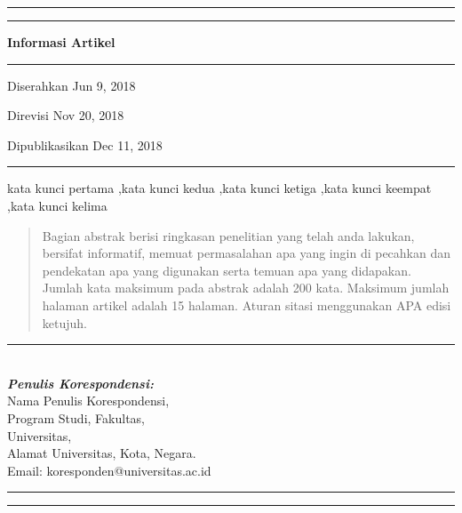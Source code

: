 \documentclass{iaesarticle-progres}
\begin{document}
\hrule
\vspace{.1em}
\hrule
\vspace{.5em}
\noindent
\parbox[t][][s]{0.275\textwidth}{%
\textbf{Informasi Artikel}
\vspace{.5em}
\hrule
\vspace{.5em}
\begin{history}
\vspace{.5em}

Diserahkan Jun 9, 2018

Direvisi Nov 20, 2018

Dipublikasikan Dec 11, 2018

\vspace{.7em}
\end{history}
\vspace{.5em}
\hrule
\vspace{.5em}
\begin{keyword} 
\vspace{.5em}
kata kunci pertama \sep kata kunci kedua \sep kata kunci ketiga \sep kata kunci keempat \sep kata kunci kelima
\vspace{.5em}
\end{keyword}
\vspace{\fill}
}
\parbox{0.025\textwidth}{\hspace{0.5em}}
\parbox[t][][s]{0.7\textwidth}{%
\begin{abstract}
\vspace{.3em}
Bagian abstrak berisi ringkasan penelitian yang telah anda lakukan, bersifat informatif, memuat permasalahan apa yang ingin di pecahkan dan pendekatan apa yang digunakan serta temuan apa yang didapakan. Jumlah kata maksimum pada abstrak adalah 200 kata. Maksimum jumlah halaman artikel adalah 15 halaman. Aturan sitasi menggunakan APA edisi ketujuh.
\end{abstract}
}
\parbox[l]{\textwidth}{%
\rule{0.275\textwidth}{0.5pt} \hspace{0.5cm} \hrulefill
\\
\emph{\textbf{Penulis Korespondensi:}}
\vspace{.5em}\\
Nama Penulis Korespondensi,\\
Program Studi, Fakultas,\\
Universitas,\\
Alamat Universitas, Kota, Negara.\\
Email: koresponden@universitas.ac.id
}
\vspace{.5em}
\hrule
\vspace{.1em}
\hrule
\end{document}
